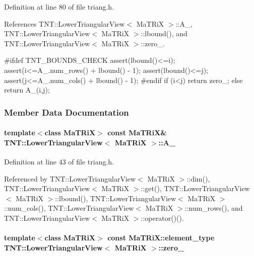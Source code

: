 Definition at line 80 of file triang.h.



References TNT::LowerTriangularView$<$ MaTRiX $>$::A\_\-, TNT::LowerTriangularView$<$ MaTRiX $>$::lbound(), and TNT::LowerTriangularView$<$ MaTRiX $>$::zero\_\-.




\begin{DoxyCode}
    {
#ifdef TNT_BOUNDS_CHECK
        assert(lbound()<=i);
        assert(i<=A_.num_rows() + lbound() - 1);
        assert(lbound()<=j);
        assert(j<=A_.num_cols() + lbound() - 1);
#endif
        if (i<j) 
            return zero_;
        else
            return A_(i,j);
    }
\end{DoxyCode}




\subsubsection{Member Data Documentation}
\paragraph[{A\_\-}]{\setlength{\rightskip}{0pt plus 5cm}template$<$class MaTRiX$>$ const MaTRiX\& {\bf TNT::LowerTriangularView}$<$ MaTRiX $>$::{\bf A\_\-}}\hfill\label{class_t_n_t_1_1_lower_triangular_view_ac334eb0cb5c6d100cf8dd1424914517a}


Definition at line 43 of file triang.h.



Referenced by TNT::LowerTriangularView$<$ MaTRiX $>$::dim(), TNT::LowerTriangularView$<$ MaTRiX $>$::get(), TNT::LowerTriangularView$<$ MaTRiX $>$::lbound(), TNT::LowerTriangularView$<$ MaTRiX $>$::num\_\-cols(), TNT::LowerTriangularView$<$ MaTRiX $>$::num\_\-rows(), and TNT::LowerTriangularView$<$ MaTRiX $>$::operator()().

\paragraph[{zero\_\-}]{\setlength{\rightskip}{0pt plus 5cm}template$<$class MaTRiX$>$ const MaTRiX::element\_\-type {\bf TNT::LowerTriangularView}$<$ MaTRiX $>$::{\bf zero\_\-}}\hfill\label{class_t_n_t_1_1_lower_triangular_view_a4028ec2cebcf9777ddba981604ee253b}



